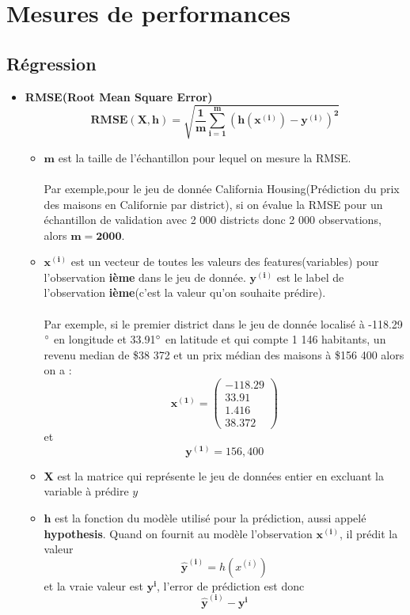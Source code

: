 \documentclass[french]{article}
\begin{document}
	\section{Mesures de performances}
	\subsection{Régression}
	
	\begin{itemize}[label=\textbullet, font=\LARGE \color{red}]
		\item \textbf{RMSE(Root Mean Square Error)}
		$$\bm{RMSE(X,h)=\sqrt{\frac{1}{m}\sum_{i=1}^{m}(h(x^{(i)})-y^{(i)})^{2}}}$$
		\begin{itemize}[label=\textbullet]
			\item $\bm{m}$ est la taille de l'échantillon pour lequel on mesure la RMSE.\\\\
			Par exemple,pour le jeu de donnée California Housing(Prédiction du prix des maisons en Californie par district), si on évalue la RMSE pour un échantillon de validation avec 2 000 districts donc 2 000 observations, alors $\bm{m=2 000}$.
			
			\item $\bm{x^{(i)}}$ est un vecteur de toutes les valeurs des features(variables) pour l'observation \textbf{ième} dans le jeu de donnée. $\bm{y^{(i)}}$ est le label de l'observation \textbf{ième}(c'est la valeur qu'on souhaite prédire).\\\\
			Par exemple, si le premier district dans le jeu de donnée localisé à -118.29$\degree$ en longitude et 33.91$\degree$ en latitude et qui compte 1 146 habitants, un revenu median de \$38 372 et un prix médian des maisons à \$156 400 alors on a :
			$$\bm{x^{(1)}}=\left( \begin{array}{c}
			-118.29 \\
			33.91 \\
			1.416 \\
			38.372
			\end{array} \right)$$
			et
			$$\bm{y^{(1)}}=156,400$$
			
			\item \textbf{X} est la matrice qui représente le jeu de données entier en excluant la variable à prédire $y$
			
			\item $\bm{h}$ est la fonction du modèle utilisé pour la prédiction, aussi appelé \textbf{hypothesis}. Quand on fournit au modèle l'observation $\bm{x^{(i)}}$, il prédit la valeur $$\bm{\hat{y}^{(i)}}=h(x^{(i)})$$
			et la vraie valeur est $\bm{y^{i}}$, l'error de prédiction est donc $$\bm{\hat{y}^{(i)}-y^{i}}$$
			

\end{itemize}
\end{itemize}
\end{document}

